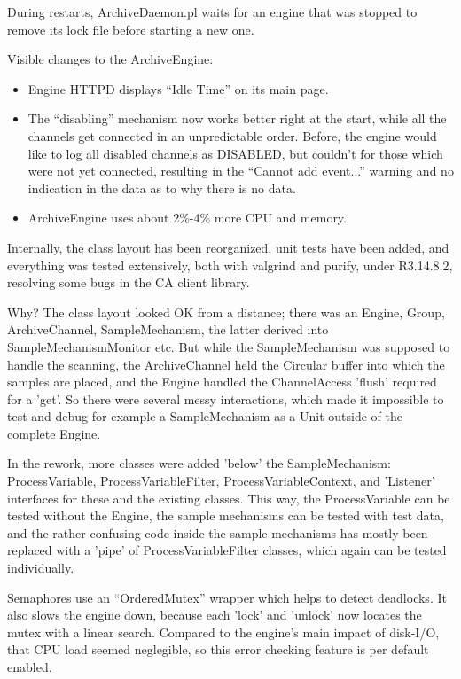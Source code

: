 \begin{itemize}
During restarts, ArchiveDaemon.pl waits for an engine that was stopped
to remove its lock file before starting a new one.

Visible changes to the ArchiveEngine:
\begin{itemize}
\item Engine HTTPD displays ``Idle Time'' on its main page.
\item The ``disabling'' mechanism now works better right at the start,
      while all the channels get connected in an unpredictable order.
      Before, the engine would like to log all disabled channels as DISABLED,
      but couldn't for those which were not yet connected,
      resulting in the ``Cannot add event...'' warning and no indication
      in the data as to why there is no data.
\item ArchiveEngine uses about 2\%-4\% more CPU and memory.
\end{itemize}

Internally, the class layout has been reorganized,
unit tests have been added, and everything was tested
extensively, both with valgrind and purify,
under R3.14.8.2, resolving some bugs in the CA client library.

Why? The class layout looked OK from a distance;
there was an Engine, Group, ArchiveChannel, SampleMechanism,
the latter derived into SampleMechanismMonitor etc.
But while the SampleMechanism was supposed to handle
the scanning, the ArchiveChannel held the Circular buffer
into which the samples are placed,
and the Engine handled the ChannelAccess 'flush' required
for a 'get'. So there were several messy interactions,
which made it impossible to test and debug for example a SampleMechanism
as a Unit outside of the complete Engine.

In the rework, more classes were added 'below' the SampleMechanism:
ProcessVariable, ProcessVariableFilter, ProcessVariableContext,
and 'Listener' interfaces for these and the existing classes.
This way, the ProcessVariable can be tested without the Engine,
the sample mechanisms can be tested with test data,
and the rather confusing code inside the sample mechanisms
has mostly been replaced with a 'pipe' of ProcessVariableFilter
classes, which again can be tested individually.

Semaphores use an ``OrderedMutex'' wrapper which helps
to detect deadlocks. It also slows the engine down, because
each 'lock' and 'unlock' now locates the mutex with a linear
search. Compared to the  engine's main impact of disk-I/O, that
CPU load seemed neglegible, so this error checking feature
is per default enabled.


\end{itemize}

